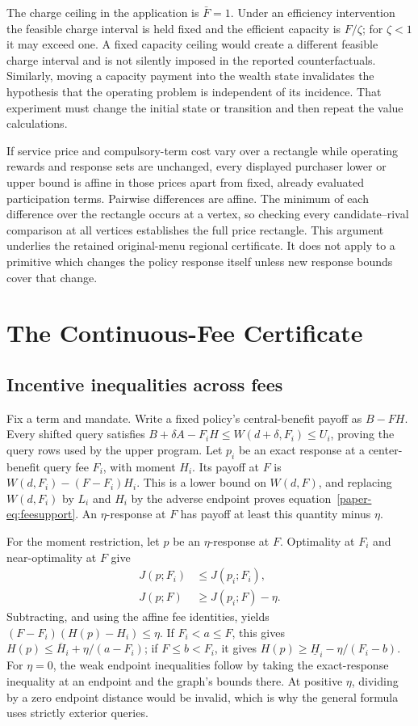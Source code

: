 The charge ceiling in the application is $\bar F=1$. Under an efficiency intervention the feasible charge interval is held fixed and the efficient capacity is $F/\zeta$; for $\zeta<1$ it may exceed one. A fixed capacity ceiling would create a different feasible charge interval and is not silently imposed in the reported counterfactuals. Similarly, moving a capacity payment into the wealth state invalidates the hypothesis that the operating problem is independent of its incidence. That experiment must change the initial state or transition and then repeat the value calculations.

If service price and compulsory-term cost vary over a rectangle while operating rewards and response sets are unchanged, every displayed purchaser lower or upper bound is affine in those prices apart from fixed, already evaluated participation terms. Pairwise differences are affine. The minimum of each difference over the rectangle occurs at a vertex, so checking every candidate--rival comparison at all vertices establishes the full price rectangle. This argument underlies the retained original-menu regional certificate. It does not apply to a primitive which changes the policy response itself unless new response bounds cover that change.

\section{The Continuous-Fee Certificate}
\subsection{Incentive inequalities across fees}
Fix a term and mandate. Write a fixed policy's central-benefit payoff as $B-FH$. Every shifted query satisfies
$B+\delta A-F_iH\leq W(d+\delta,F_i)\leq U_i$, proving the query rows used by the upper program. Let $p_i$ be an exact response at a center-benefit query fee $F_i$, with moment $H_i$. Its payoff at $F$ is $W(d,F_i)-(F-F_i)H_i$. This is a lower bound on $W(d,F)$, and replacing $W(d,F_i)$ by $L_i$ and $H_i$ by the adverse endpoint proves equation~\eqref{paper-eq:feesupport}. An $\eta$-response at $F$ has payoff at least this quantity minus $\eta$.

For the moment restriction, let $p$ be an $\eta$-response at $F$. Optimality at $F_i$ and near-optimality at $F$ give
\begin{align*}
 J(p;F_i)&\leq J(p_i;F_i),\\
 J(p;F)&\geq J(p_i;F)-\eta.
\end{align*}
Subtracting, and using the affine fee identities, yields
$(F-F_i)(H(p)-H_i)\leq\eta$. If $F_i<a\leq F$, this gives
$H(p)\leq\overline H_i+\eta/(a-F_i)$; if $F\leq b<F_i$, it gives
$H(p)\geq\underline H_i-\eta/(F_i-b)$. For $\eta=0$, the weak endpoint inequalities follow by taking the exact-response inequality at an endpoint and the graph's bounds there. At positive $\eta$, dividing by a zero endpoint distance would be invalid, which is why the general formula uses strictly exterior queries.

